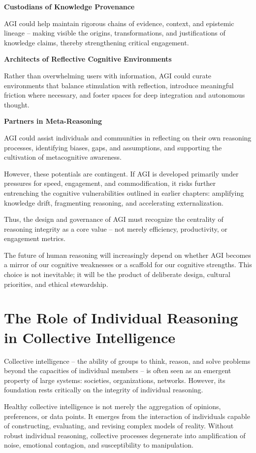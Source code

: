 \textbf{Custodians of Knowledge Provenance}

AGI could help maintain rigorous chains of evidence, context, and
epistemic lineage -- making visible the origins, transformations, and
justifications of knowledge claims, thereby strengthening critical
engagement.

\textbf{Architects of Reflective Cognitive Environments}

Rather than overwhelming users with information, AGI could curate
environments that balance stimulation with reflection, introduce
meaningful friction where necessary, and foster spaces for deep
integration and autonomous thought.

\textbf{Partners in Meta-Reasoning}

AGI could assist individuals and communities in reflecting on their own
reasoning processes, identifying biases, gaps, and assumptions, and
supporting the cultivation of metacognitive awareness.

However, these potentials are contingent. If AGI is developed primarily
under pressures for speed, engagement, and commodification, it risks
further entrenching the cognitive vulnerabilities outlined in earlier
chapters: amplifying knowledge drift, fragmenting reasoning, and
accelerating externalization.

Thus, the design and governance of AGI must recognize the centrality of
reasoning integrity as a core value -- not merely efficiency,
productivity, or engagement metrics.

The future of human reasoning will increasingly depend on whether AGI
becomes a mirror of our cognitive weaknesses or a scaffold for our
cognitive strengths. This choice is not inevitable; it will be the
product of deliberate design, cultural priorities, and ethical
stewardship.



\section{The Role of Individual Reasoning in Collective Intelligence}

Collective intelligence -- the ability of groups to think, reason, and
solve problems beyond the capacities of individual members -- is often
seen as an emergent property of large systems: societies, organizations,
networks. However, its foundation rests critically on the integrity of
individual reasoning.

Healthy collective intelligence is not merely the aggregation of
opinions, preferences, or data points. It emerges from the interaction
of individuals capable of constructing, evaluating, and revising complex
models of reality. Without robust individual reasoning, collective
processes degenerate into amplification of noise, emotional contagion,
and susceptibility to manipulation.

